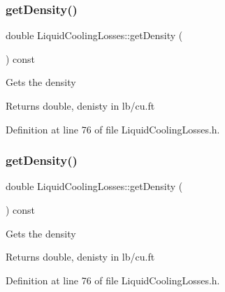 \subsubsection{\texorpdfstring{get\+Density()}{getDensity()}\hspace{0.1cm}{\footnotesize\ttfamily [1/3]}}
{\footnotesize\ttfamily double Liquid\+Cooling\+Losses\+::get\+Density (\begin{DoxyParamCaption}{ }\end{DoxyParamCaption}) const\hspace{0.3cm}{\ttfamily [inline]}}

Gets the density

\begin{DoxyReturn}{Returns}
double, denisty in lb/cu.\+ft 
\end{DoxyReturn}


Definition at line 76 of file Liquid\+Cooling\+Losses.\+h.

\mbox{\label{class_liquid_cooling_losses_ab2a34915eeba8bcea46d67a72cbe17d2}} 
\subsubsection{\texorpdfstring{get\+Density()}{getDensity()}\hspace{0.1cm}{\footnotesize\ttfamily [2/3]}}
{\footnotesize\ttfamily double Liquid\+Cooling\+Losses\+::get\+Density (\begin{DoxyParamCaption}{ }\end{DoxyParamCaption}) const\hspace{0.3cm}{\ttfamily [inline]}}

Gets the density

\begin{DoxyReturn}{Returns}
double, denisty in lb/cu.\+ft 
\end{DoxyReturn}


Definition at line 76 of file Liquid\+Cooling\+Losses.\+h.

\mbox{\label{class_liquid_cooling_losses_ab2a34915eeba8bcea46d67a72cbe17d2}} 
